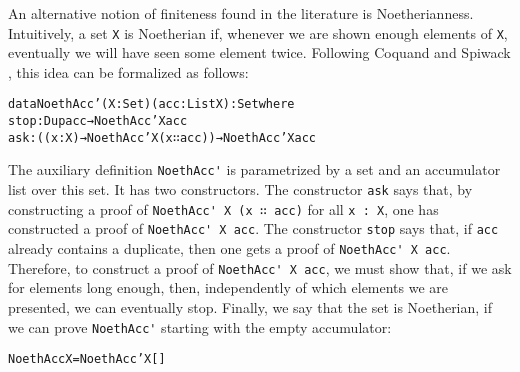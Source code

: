 \documentclass{eptcs}
\begin{document}
An alternative notion of finiteness found in the literature is
Noetherianness. Intuitively, a set \verb+X+ is Noetherian if, whenever we are shown enough
elements of \verb+X+, eventually we will have seen some element twice. Following Coquand and Spiwack \cite{Coquand}, this idea can be formalized as follows:
\begin{alltt}
data NoethAcc' (X : Set) (acc : List X) : Set where
  stop : Dup acc → NoethAcc' X acc
  ask  : ((x : X) → NoethAcc' X (x ∷ acc)) → NoethAcc' X acc
\end{alltt}
The auxiliary definition \verb;NoethAcc'; is parametrized by a set and
an accumulator list over this set. It has two constructors. The
constructor \verb;ask; says that, by constructing a proof of
\verb;NoethAcc' X (x ∷ acc); for all \verb+x : X+, one has 
constructed a proof of \verb;NoethAcc' X acc;. The constructor
\verb;stop; says that, if \verb;acc; already contains a duplicate, then
one gets a proof of \verb;NoethAcc' X acc;. Therefore, to construct a proof of
\verb;NoethAcc' X acc;, we must show that, if we ask for elements long
enough, then, independently of which elements we are presented, we can
eventually stop. Finally, we say that the set is Noetherian, if we can prove
\verb;NoethAcc'; starting with the empty accumulator:
\begin{alltt}
NoethAcc X = NoethAcc' X []
\end{alltt}
\end{document}
